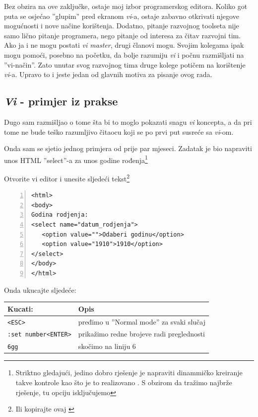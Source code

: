 \documentclass[times, utf8, seminar]{fit}
\begin{document}
Bez obzira na ove zaključke,  ostaje moj izbor programerskog editora.  Koliko got puta se osjećao ''glupim'' pred ekranom \emph{vi}-a, ostaje zabavno otkrivati njegove mogućnosti i nove načine korištenja. Dodatno, pitanje razvojnog toolseta nije samo lično pitanje programera, nego pitanje od interesa za čitav razvojni tim. 
Ako ja i ne mogu postati \emph{vi master}, drugi članovi mogu. Svojim kolegama ipak mogu pomoći, posebno na početku, da bolje razumiju \emph{vi} i počnu razmišljati na ''vi-način''. Zato unutar svog razvojnog tima druge kolege potičem na korištenje \emph{vi}-a. Upravo to i jeste jedan od glavnih motiva za pisanje ovog rada.

\subsection{\emph{Vi} - primjer iz prakse}

Dugo sam razmišljao o tome šta bi to moglo pokazati snagu \emph{vi} koncepta, a da pri tome ne bude teško razumljivo čitaocu koji se po prvi put susreće sa \emph{vi}-om.

Onda sam se sjetio jednog primjera od prije par mjeseci. Zadatak je bio napraviti unos HTML ''select''-a za unos godine rođenja\footnote{Striktno gledajući, jedino dobro rješenje je napraviti dinammičko kreiranje takve kontrole kao što je to realizovano \href{https://github.com/hernad/FIT\_WT/blob/master/09\_2012/util.js\#L9}{\color{blue}{ovdje}}. S obzirom da tražimo najbrže rješenje, tu opciju isključujemo}

Otvorite vi editor i unesite sljedeći tekst\footnote{Ili kopirajte ovaj \href{https://gist.github.com/raw/4412263/1e751a7305ab75823689cfb7654304337f75336e/gistfile1.txt}{\color{blue}{gist}}}
\begin{lstlisting}[numbers=left]
<html>
<body>
Godina rodjenja:
<select name="datum_rodjenja">
   <option value="">Odaberi godinu</option>
   <option value="1910">1910</option>
</select>
</body>
</html>
\end{lstlisting}

Onda ukucajte sljedeće:

\begin{center}
\begin{tabular}{ l | l }
  \hline                        
   Kucati:    &  Opis \\ 
   \hline
   \verb+<ESC>+     & pređimo u ''Normal mode'' za svaki slučaj \\
   \verb+:set number<ENTER>+ &  prikažimo redne brojeve radi preglednosti \\
   \verb+6gg+    & skočimo na liniju 6 \\
   \hline
\end{tabular}
\end{center}
\end{document}
